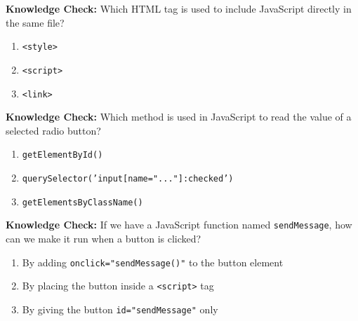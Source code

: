\documentclass{article}
\begin{document}
\vspace{0.5cm} %

\textbf{Knowledge Check:} Which HTML tag is used to include JavaScript directly in the same file?

\begin{enumerate}[label=\Alph*), topsep=4pt, itemsep=2pt, partopsep=0pt]
  \item \texttt{<style>}
  \item \texttt{<script>}
  \item \texttt{<link>}
\end{enumerate}

\vspace{0.5cm} %

\textbf{Knowledge Check:} Which method is used in JavaScript to read the value of a selected radio button?

\begin{enumerate}[label=\Alph*), topsep=4pt, itemsep=2pt, partopsep=0pt]
  \item \texttt{getElementById()}
  \item \texttt{querySelector('input[name="..."]:checked')}
  \item \texttt{getElementsByClassName()}
\end{enumerate}

\vspace{0.5cm}

\textbf{Knowledge Check:} If we have a JavaScript function named \texttt{sendMessage}, how can we make it run when a button is clicked?

\begin{enumerate}[label=\Alph*), topsep=4pt, itemsep=2pt, partopsep=0pt]
  \item By adding \texttt{onclick="sendMessage()"} to the button element
  \item By placing the button inside a \texttt{<script>} tag
  \item By giving the button \texttt{id="sendMessage"} only
\end{enumerate}

\vspace{0.5cm}
\end{document}
